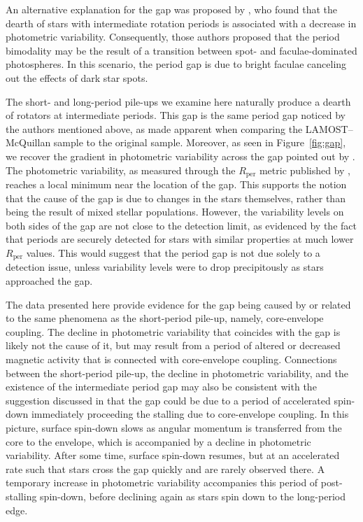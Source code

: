 \documentclass[linenumbers,tighten,trackchanges,twocolumn]{aastex631}
\newcommand{\lamostmcq}{LAMOST--McQuillan\xspace}
\newcommand{\rper}{\ensuremath{R_\mathrm{per}}\xspace}
\begin{document}
An alternative explanation for the gap was proposed by \citet{Reinhold2019}, who found that the dearth of stars with intermediate rotation periods is associated with a decrease in photometric variability. Consequently, those authors proposed that the period bimodality may be the result of a transition between spot- and faculae-dominated photospheres. In this scenario, the period gap is due to bright faculae canceling out the effects of dark star spots. 

The short- and long-period pile-ups we examine here naturally produce a dearth of rotators at intermediate periods. This gap is the same period gap noticed by the authors mentioned above, as made apparent when comparing the \lamostmcq sample to the original \citet{McQuillan2014} sample. Moreover, as seen in Figure~\ref{fig:gap}, we recover the gradient in photometric variability across the gap pointed out by \citet{Reinhold2019}. The photometric variability, as measured through the \rper metric published by \citet{McQuillan2014}, reaches a local minimum near the location of the gap. This supports the notion that the cause of the gap is due to changes in the stars themselves, rather than being the result of mixed stellar populations. However, the variability levels on both sides of the gap are not close to the detection limit, as evidenced by the fact that periods are securely detected for stars with similar properties at much lower \rper values. This would suggest that the period gap is not due solely to a detection issue, unless variability levels were to drop precipitously as stars approached the gap. 

{\color{red} The data presented here provide evidence for the gap being caused by or related to the same phenomena as the short-period pile-up, namely, core-envelope coupling. The decline in photometric variability that coincides with the gap is likely not the cause of it, but may result from a period of altered or decreased magnetic activity that is connected with core-envelope coupling. Connections between the short-period pile-up, the decline in photometric variability, and the existence of the intermediate period gap may also be consistent with the suggestion discussed in \citet{Gordon2021} that the gap could be due to a period of accelerated spin-down immediately proceeding the stalling due to core-envelope coupling. In this picture, surface spin-down slows as angular momentum is transferred from the core to the envelope, which is accompanied by a decline in photometric variability. After some time, surface spin-down resumes, but at an accelerated rate such that stars cross the gap quickly and are rarely observed there. A temporary increase in photometric variability accompanies this period of post-stalling spin-down, before declining again as stars spin down to the long-period edge.}
\end{document}
